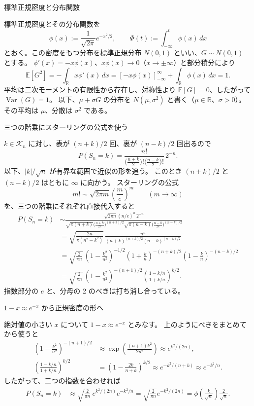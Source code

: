 \documentclass[a4paper,10pt,pdflatex,ja=standard,jafont=ipaex-type1,
  magstyle=real,scale=1]{bxjsarticle}
\newcommand{\topic}[1]{\par\vspace{5pt}
  {\large\sffamily\mdseries\color{accent}#1}\par\vspace{2pt}}
\newcommand{\R}{\mathbb R}
\newcommand{\E}{\mathbb E}
\newcommand{\Var}{\operatorname{Var}}
\begin{document}
\topic{標準正規密度と分布関数}
標準正規密度とその分布関数を
$$\phi(x):=\frac1{\sqrt{2\pi}}e^{-x^2/2},\qquad
 \Phi(t):=\int_{-\infty}^t\phi(x)\,dx$$
とおく。この密度をもつ分布を標準正規分布 $N(0,1)$ といい、$G\sim N(0,1)$ とする。
$\phi'(x)=-x\phi(x)$、$x\phi(x)\to0$（$x\to\pm\infty$）と部分積分により
$$\E[G^2]=-\int_\R x\phi'(x)\,dx
 =[-x\phi(x)]_{-\infty}^{\infty}+\int_\R\phi(x)\,dx=1.$$
平均は二次モーメントの有限性から存在し、対称性より $\E[G]=0$、したがって $\Var(G)=1$。
以下、$\mu+\sigma G$ の分布を $N(\mu,\sigma^2)$ と書く（$\mu\in\R$、$\sigma>0$）。
その平均は $\mu$、分散は $\sigma^2$ である。
\newpage
\topic{三つの階乗にスターリングの公式を使う}
$k\in\mathcal K_n$ に対し、表が $(n+k)/2$ 回、裏が $(n-k)/2$ 回出るので
$$P(S_n=k)=\frac{n!}{\bigl(\frac{n+k}{2}\bigr)!\bigl(\frac{n-k}{2}\bigr)!}\,2^{-n}.$$
以下、$|k|/\sqrt n$ が有界な範囲で近似の形を追う。
このとき $(n+k)/2$ と $(n-k)/2$ はともに $\infty$ に向かう。
スターリングの公式
$$m!\sim\sqrt{2\pi m}\left(\frac me\right)^m\qquad(m\to\infty)$$
を、三つの階乗にそれぞれ直接代入すると
$$\begin{aligned}
 P(S_n=k)
 &\sim\frac{\sqrt{2\pi n}(n/e)^n\,2^{-n}}
 {\sqrt{\pi(n+k)}\bigl(\frac{n+k}{2e}\bigr)^{(n+k)/2}
  \sqrt{\pi(n-k)}\bigl(\frac{n-k}{2e}\bigr)^{(n-k)/2}}\\
 &=\sqrt{\frac{2n}{\pi(n^2-k^2)}}\,
 \frac{n^n}{(n+k)^{(n+k)/2}(n-k)^{(n-k)/2}}\\
 &=\sqrt{\frac{2}{\pi n}}\,
 \left(1-\frac{k^2}{n^2}\right)^{-1/2}
 \left(1+\frac{k}{n}\right)^{-(n+k)/2}
 \left(1-\frac{k}{n}\right)^{-(n-k)/2}\\
 &=\sqrt{\frac{2}{\pi n}}\,
 \left(1-\frac{k^2}{n^2}\right)^{-(n+1)/2}
 \left(\frac{1-k/n}{1+k/n}\right)^{k/2}.
\end{aligned}$$
指数部分の $e$ と、分母の $2$ のべきは打ち消し合っている。

\topic{$1-x\approx e^{-x}$ から正規密度の形へ}
絶対値の小さい $x$ について $1-x\approx e^{-x}$ とみなす。
上のようにべきをまとめてから使うと
$$\begin{aligned}
 \left(1-\frac{k^2}{n^2}\right)^{-(n+1)/2}
 &\approx\exp\left(\frac{(n+1)k^2}{2n^2}\right)
 \approx e^{k^2/(2n)},\\
 \left(\frac{1-k/n}{1+k/n}\right)^{k/2}
 &=\left(1-\frac{2k}{n+k}\right)^{k/2}
 \approx e^{-k^2/(n+k)}\approx e^{-k^2/n}.
\end{aligned}$$
したがって、二つの指数を合わせれば
$$\begin{aligned}
 P(S_n=k)&\approx\sqrt{\frac{2}{\pi n}}\,
 e^{k^2/(2n)}e^{-k^2/n}
 =\sqrt{\frac{2}{\pi n}}e^{-k^2/(2n)}=\phi\left(\frac{k}{\sqrt n}\right)\frac{2}{\sqrt n}.
\end{aligned}$$
\end{document}
